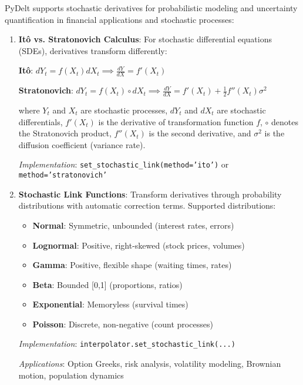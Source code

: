 \documentclass[10pt,journal,compsoc]{IEEEtran}
\begin{document}
PyDelt supports stochastic derivatives for probabilistic modeling and uncertainty quantification in financial applications and stochastic processes:

\begin{enumerate}
    \item \textbf{Itô vs. Stratonovich Calculus}: For stochastic differential equations (SDEs), derivatives transform differently:
    
    \textbf{Itô}: $dY_t = f(X_t)dX_t \implies \frac{dY}{dX} = f'(X_t)$
    
    \textbf{Stratonovich}: $dY_t = f(X_t) \circ dX_t \implies \frac{dY}{dX} = f'(X_t) + \frac{1}{2}f''(X_t)\sigma^2$
    
    where $Y_t$ and $X_t$ are stochastic processes, $dY_t$ and $dX_t$ are stochastic differentials, $f'(X_t)$ is the derivative of transformation function $f$, $\circ$ denotes the Stratonovich product, $f''(X_t)$ is the second derivative, and $\sigma^2$ is the diffusion coefficient (variance rate).
    
    
    \textit{Implementation}: \texttt{set\_stochastic\_link(method='ito')} or \texttt{method='stratonovich'}
    
    \item \textbf{Stochastic Link Functions}: Transform derivatives through probability distributions with automatic correction terms. Supported distributions:
    
    \begin{itemize}
        \item \textbf{Normal}: Symmetric, unbounded (interest rates, errors)
        \item \textbf{Lognormal}: Positive, right-skewed (stock prices, volumes)
        \item \textbf{Gamma}: Positive, flexible shape (waiting times, rates)
        \item \textbf{Beta}: Bounded [0,1] (proportions, ratios)
        \item \textbf{Exponential}: Memoryless (survival times)
        \item \textbf{Poisson}: Discrete, non-negative (count processes)
    \end{itemize}
    
    
    \textit{Implementation}: \texttt{interpolator.set\_stochastic\_link(...)}
    
    \textit{Applications}: Option Greeks, risk analysis, volatility modeling, Brownian motion, population dynamics
\end{enumerate}
\end{document}
